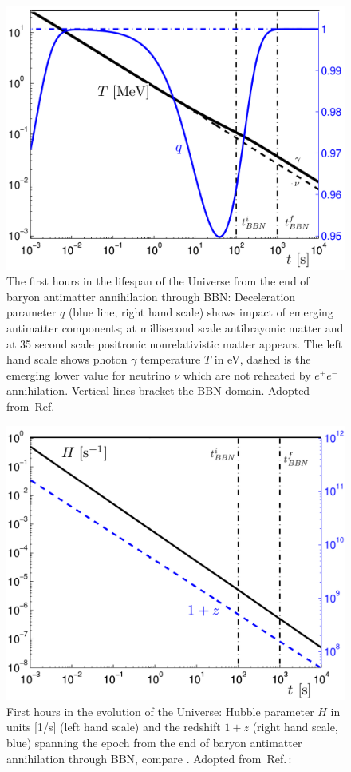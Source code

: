 \begin{figure}
\centerline{\includegraphics[width=0.88\linewidth]{01-introduction/Figures/TqBBN.png}}
\caption{The first hours in the lifespan of the Universe  from the end of baryon antimatter annihilation through BBN: Deceleration parameter $q$ (blue line, right hand scale) shows impact of emerging antimatter components; at millisecond scale antibrayonic matter and at 35 second scale positronic nonrelativistic matter appears. The left hand scale shows photon $\gamma$ temperature $T$ in eV, dashed is the emerging lower value for neutrino $\nu$ which are not reheated by $e^+e^-$ annihilation. Vertical lines bracket the BBN domain. Adopted from~Ref.\,\cite{Rafelski:2013yka}  
\label{fig:BBN}}
\end{figure}

\begin{figure}
\centerline{\includegraphics[width=0.88\linewidth]{01-introduction/Figures/HzBBN.png}} 
\caption{First hours in the evolution of the Universe: Hubble parameter $H$ in units [1/s] (left hand scale) and the redshift $1+z$ (right hand scale, blue) spanning the epoch from  the end of baryon antimatter annihilation through BBN, compare . Adopted from~Ref.\,\cite{Rafelski:2013yka}: 
\label{fig:BBN1}}
\end{figure}

